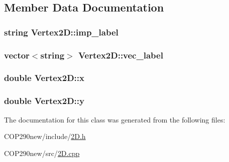 \subsection{Member Data Documentation}
\subsubsection[{\texorpdfstring{imp\+\_\+label}{imp_label}}]{\setlength{\rightskip}{0pt plus 5cm}string Vertex2\+D\+::imp\+\_\+label}\hypertarget{class_vertex2_d_a0fb87360c2cdc626c5bf36a0497a5263}{}\label{class_vertex2_d_a0fb87360c2cdc626c5bf36a0497a5263}
\subsubsection[{\texorpdfstring{vec\+\_\+label}{vec_label}}]{\setlength{\rightskip}{0pt plus 5cm}vector$<$string$>$ Vertex2\+D\+::vec\+\_\+label}\hypertarget{class_vertex2_d_ac21cbc3f2a3354c6c71e136549a1b832}{}\label{class_vertex2_d_ac21cbc3f2a3354c6c71e136549a1b832}
\subsubsection[{\texorpdfstring{x}{x}}]{\setlength{\rightskip}{0pt plus 5cm}double Vertex2\+D\+::x}\hypertarget{class_vertex2_d_aa8314119072228cac9e9375a5554a071}{}\label{class_vertex2_d_aa8314119072228cac9e9375a5554a071}
\subsubsection[{\texorpdfstring{y}{y}}]{\setlength{\rightskip}{0pt plus 5cm}double Vertex2\+D\+::y}\hypertarget{class_vertex2_d_a8f6f634d47c703e6c537c54e060c05c4}{}\label{class_vertex2_d_a8f6f634d47c703e6c537c54e060c05c4}


The documentation for this class was generated from the following files\+:\begin{DoxyCompactItemize}
\item 
C\+O\+P290new/include/\hyperlink{2_d_8h}{2\+D.\+h}\item 
C\+O\+P290new/src/\hyperlink{2_d_8cpp}{2\+D.\+cpp}\end{DoxyCompactItemize}
